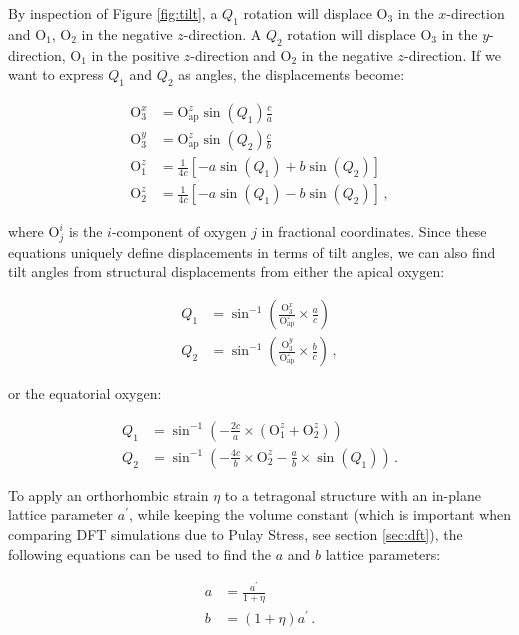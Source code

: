 By inspection of Figure \ref{fig:tilt}, a $Q_1$ rotation will displace O$_3$ in the $x$-direction and O$_1$, O$_2$ in the negative $z$-direction. A $Q_2$ rotation will displace O$_3$ in the $y$-direction, O$_1$ in the positive $z$-direction and O$_2$ in the negative $z$-direction. If we want to express $Q_1$ and $Q_2$ as angles, the displacements become:

\begin{align*}
\text{O}_3^x &= \text{O}_\text{ap}^z  \sin (Q_1) \frac{c}{a} \\
\text{O}_3^y &= \text{O}_\text{ap}^z \sin (Q_2) \frac{c}{b} \\
\text{O}_1^z &= \frac{1}{4c} \left[ - a \sin (Q_1) + b \sin (Q_2) \right] \\
\text{O}_2^z &= \frac{1}{4c} \left[ - a \sin (Q_1) - b \sin (Q_2) \right] \, ,
\end{align*}

\noindent where $\text{O}^i_j$ is the $i$-component of oxygen $j$ in fractional coordinates. Since these equations uniquely define displacements in terms of tilt angles, we can also find tilt angles from structural displacements from either the apical oxygen:

\begin{align*}
Q_1 &= \sin^{-1} \left( \frac{\text{O}_3^x}{\text{O}_\text{ap}^z} \times \frac{a}{c} \right) \\
Q_2 &= \sin^{-1} \left( \frac{\text{O}_3^y}{\text{O}_\text{ap}^z} \times \frac{b}{c} \right) \, ,
\end{align*}

\noindent or the equatorial oxygen:

\begin{align*}
Q_1 &= \sin^{-1}  \left( - \frac{2c}{a} \times (\text{O}_1^z + \text{O}_2^z) \right) \\
Q_2 &= \sin^{-1}  \left( -\frac{4c}{b} \times \text{O}_2^z - \frac{a}{b} \times \sin (Q_1) \right) \, .
\end{align*}

\noindent To apply an orthorhombic strain $\eta$ to a tetragonal structure with an in-plane lattice parameter $a^\prime$, while keeping the volume constant (which is important when comparing DFT simulations due to Pulay Stress, see section \ref{sec:dft}), the following equations can be used to find the $a$ and $b$ lattice parameters:

\begin{align*}
	a &= \frac{a^\prime}{1+\eta} \\
	b &= (1+\eta) a^\prime \, .
\end{align*}

